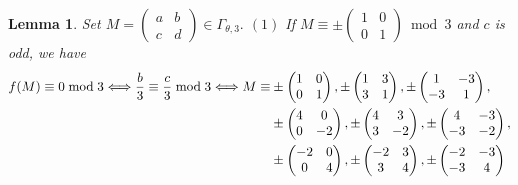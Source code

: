 \documentclass[12pt]{article}
\theoremstyle{definition}
\newtheorem{lemma}[theorem]{Lemma}
\numberwithin{equation}{section}
\numberwithin{theorem}{section}
\begin{document}
\begin{lemma}
\label{lem:level3-mod3}
{\it
Set 
$
M=
\begin{pmatrix}
a & b \\
c & d
\end{pmatrix}
\in\Gamma_{\theta,3}.
$
\newline
$\mathrm{(1)}$ If 
$
M
\equiv
\pm
\begin{pmatrix}
1 & 0 \\
0 & 1
\end{pmatrix}
\bmod{3}
$ 
and $c$ is odd, 
we have 
\begin{align*}
f(M)\equiv 0 \bmod{3} 
\Longleftrightarrow
\frac{b}{3} \equiv \frac{c}{3} \bmod{3}
\Longleftrightarrow
M
\equiv& 
\pm
\begin{pmatrix}
1 & 0 \\
0 & 1
\end{pmatrix}, 
\pm
\begin{pmatrix}
1 & 3 \\
3 & 1
\end{pmatrix}, 
\pm
\begin{pmatrix}
1 & -3 \\
-3 & 1
\end{pmatrix},  \notag \\
&
\pm
\begin{pmatrix}
4 & 0 \\
0 & -2
\end{pmatrix},  
\pm
\begin{pmatrix}
4 & 3 \\
3 & -2
\end{pmatrix}, 
\pm
\begin{pmatrix}
4 & -3 \\
-3 & -2
\end{pmatrix}, \notag \\
&
\pm
\begin{pmatrix}
-2 & 0 \\
0 & 4
\end{pmatrix}, 
\pm
\begin{pmatrix}
-2 & 3 \\
3 & 4
\end{pmatrix}, 
\pm
\begin{pmatrix}
-2 & -3 \\
-3 & 4
\end{pmatrix} 

\end{align*}}
\end{lemma}
\end{document}
